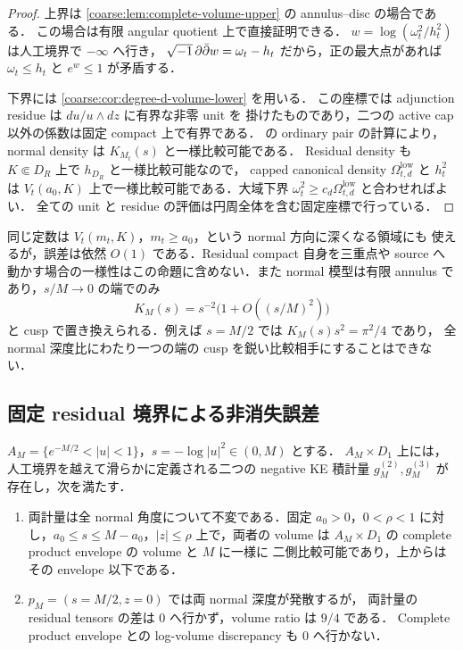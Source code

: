 \begin{proof}
上界は \cref{coarse:lem:complete-volume-upper} の annulus--disc の場合である．
この場合は有限 angular quotient 上で直接証明できる．
$w=\log(\omega_t^2/h_t^2)$ は人工境界で $-\infty$ へ行き，
$\sqrt{-1}\,\partial\bar\partial w=\omega_t-h_t$ だから，正の最大点があれば
$\omega_t\le h_t$ と $e^w\le1$ が矛盾する．

下界には \cref{coarse:cor:degree-d-volume-lower} を用いる．
この座標では adjunction residue は $du/u\wedge dz$ に有界な非零 unit を
掛けたものであり，二つの active cap 以外の係数は固定 compact 上で有界である．
 の ordinary pair の計算により，
normal density は $K_{M_t}(s)$ と一様比較可能である．
Residual density も $K\Subset D_R$ 上で $h_{D_R}$ と一様比較可能なので，
capped canonical density $\Omega_{t,d}^{\mathrm{low}}$ と $h_t^2$ は
$V_t(a_0,K)$ 上で一様比較可能である．大域下界
$\omega_t^2\ge c_d\Omega_{t,d}^{\mathrm{low}}$ と合わせればよい．
全ての unit と residue の評価は円周全体を含む固定座標で行っている．
\end{proof}

同じ定数は $V_t(m_t,K)$，$m_t\ge a_0$，という normal 方向に深くなる領域にも
使えるが，誤差は依然 $O(1)$ である．Residual compact 自身を三重点や source
へ動かす場合の一様性はこの命題に含めない．また normal 模型は有限 annulus
であり，$s/M\to0$ の端でのみ
\[
 K_M(s)=s^{-2}\bigl(1+O((s/M)^2)\bigr)
\]
と cusp で置き換えられる．例えば $s=M/2$ では $K_M(s)s^2=\pi^2/4$ であり，
全 normal 深度比にわたり一つの端の cusp を鋭い比較相手にすることはできない．

\subsection{固定 residual 境界による非消失誤差}

\begin{proposition}
\label{neck:prop:residual-boundary-obstruction}
$A_M=\{e^{-M/2}<|u|<1\}$，$s=-\log|u|^2\in(0,M)$ とする．
$A_M\times D_1$ 上には，人工境界を越えて滑らかに定義される二つの
negative KE 積計量 $g_M^{(2)},g_M^{(3)}$ が存在し，次を満たす．
\begin{enumerate}
\item 両計量は全 normal 角度について不変である．固定 $a_0>0$，$0<\rho<1$
に対し，$a_0\le s\le M-a_0$，$|z|\le\rho$ 上で，両者の volume は
$A_M\times D_1$ の complete product envelope の volume と $M$ に一様に
二側比較可能であり，上からはその envelope 以下である．
\item $p_M=(s=M/2,z=0)$ では両 normal 深度が発散するが，
両計量の residual tensors の差は $0$ へ行かず，volume ratio は $9/4$ である．
Complete product envelope との log-volume discrepancy も $0$ へ行かない．
\end{enumerate}
\end{proposition}


